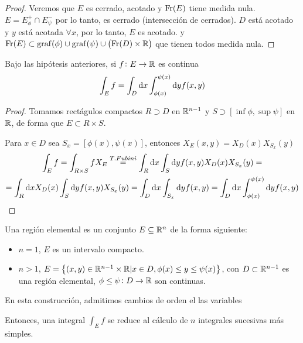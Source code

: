 \begin{proof}
    Veremos que $E$ es cerrado, acotado y $\operatorname{Fr}(E)$ tiene medida nula. $E = E^+_\phi
    \cap E^-_\psi$ por lo tanto, es cerrado (intersección de cerrados). $D$ está
    acotado y $y$ está acotada $\forall x$, por lo tanto, $E$ es acotado. y $\operatorname{Fr}(E)
    \subset \operatorname{graf}(\phi) \cup \operatorname{graf}(\psi) \cup \left( \operatorname{Fr}(D) \times \mathbb{R} \right)$ que
    tienen todos medida nula.
\end{proof}

\begin{prop}
    Bajo las hipótesis anteriores, si $f \colon E \to \mathbb{R}$ es continua
    \[
        \int_E f = \int_D \dif x \int^{\psi(x)}_{\phi(x)} \dif y f(x, y)
    \]
\end{prop}
\begin{proof}
    Tomamos rectágulos compactos $R \supset D$ en $\mathbb{R}^{n-1}$ y $S \supset [\inf\phi,
    \sup\psi]$ en $\mathbb{R}$, de forma que $E \subset R \times S$.

    Para $x \in D$ sea $S_x = [\phi(x), \psi(x)]$, entonces $X_E(x, y) =
    X_D(x)X_{S_x}(y)$
    \begin{gather*}
        \int_E f = \int_{R \times S} f X_E \stackrel{T. Fubini}{=}
        \int_R \dif x \int_S \dif y f(x, y) X_D(x) X_{S_x}(y) =\\= \int_R \dif x X_D(x) \int_S \dif y f(x,y) X_{S_x}(y) =
        \int_D \dif x \int_{S_x} \dif y f(x, y) = \int_D \dif x \int^{\psi(x)}_{\phi(x)} \dif y f(x,y)
    \end{gather*}
\end{proof}

\begin{defi}
    Una región elemental es un conjunto $E \subseteq \mathbb{R}^n$ de la forma siguiente:
    \begin{itemize}
        \item $n = 1$, $E$ es un intervalo compacto.
        \item $n > 1$, $E = \left\{(x,y) \in \mathbb{R}^{n-1} \times \mathbb{R} \vert x \in D, \phi(x) \leq y \leq \psi(x)\right\}$, con $D \subset \mathbb{R}^{n-1}$
            es una región elemental, $\phi \leq \psi \colon D \to \mathbb{R}$ son continuas.
    \end{itemize}

    En esta construcción, admitimos cambios de orden el las variables
\end{defi}

\begin{obs}
    Entonces, una integral $\int_E f$ se reduce al cálculo de $n$ integrales sucesivas más simples.
\end{obs}

